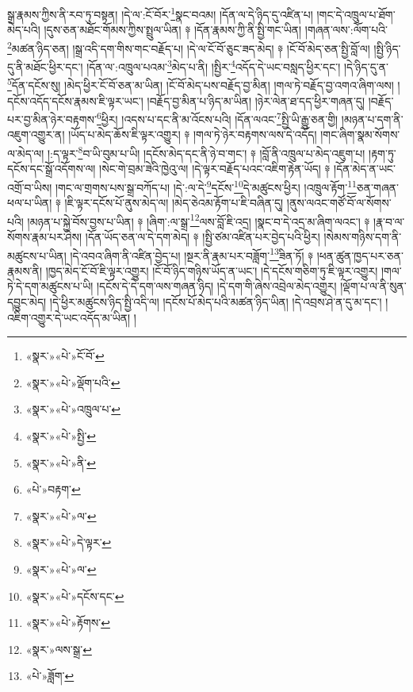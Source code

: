 སྒྲ་རྣམས་ཀྱིས་ནི་རབ་ཏུ་བསྟན། །དེ་ལ་:ངོ་བོར་\footnote{«སྣར་»«པེ་»ངོ་བོ་}སྣང་བའམ། །དོན་ལ་དེ་ཉིད་དུ་འཛིན་པ། །གང་དེ་འཁྲུལ་པ་ཐོག་མེད་པའི། །དུས་ཅན་མཐོང་གོམས་ཀྱིས་སྤྲུལ་ཡིན། ༈ །དོན་རྣམས་ཀྱི་ནི་སྤྱི་གང་ཡིན། །གཞན་ལས་:ལོག་པའི་\footnote{«སྣར་»«པེ་»ལྡོག་པའི་}མཚན་ཉིད་ཅན། །སྒྲ་འདི་དག་གིས་གང་བརྗོད་པ། །དེ་ལ་ངོ་བོ་ཅུང་ཟད་མེད། ༈ །ངོ་བོ་མེད་ཅན་སྤྱི་བློ་ལ། །སྤྱི་ཉིད་དུ་ནི་མཐོང་ཕྱིར་དང་། །དོན་ལ་:འཁྲུལ་པའམ་\footnote{«སྣར་»«པེ་»འཁྲུལ་པ་}མེད་པ་ནི། །སྤྱིར་\footnote{«སྣར་»«པེ་»སྤྱི་}འདོད་དེ་ཡང་བསླད་ཕྱིར་དང་། །དེ་ཉིད་དུ་ན་\footnote{«སྣར་»«པེ་»ནི་}དོན་དངོས་སུ། །མེད་ཕྱིར་ངོ་བོ་ཅན་མ་ཡིན། །ངོ་བོ་མེད་པས་བརྗོད་བྱ་མིན། །གལ་ཏེ་བརྗོད་བྱ་འགའ་ཞིག་ལས། །དངོས་འདོད་དངོས་རྣམས་ཇི་ལྟར་ཡང་། །བརྗོད་བྱ་མིན་པ་ཉིད་མ་ཡིན། །ཉེར་ལེན་ཐ་དད་ཕྱིར་གཞན་དུ། །བརྗོད་པར་བྱ་མིན་ཉེར་བརྟགས་\footnote{«པེ་»བརྟག་}ཕྱིར། །འདས་པ་དང་ནི་མ་འོངས་པའི། །དོན་ལའང་\footnote{«སྣར་»«པེ་»ལ་}སྤྱི་ཡི་རྒྱུ་ཅན་གྱི། །མཉན་པ་དག་ནི་འཇུག་འགྱུར་ན། །ཡོད་པ་མེད་ཆོས་ཇི་ལྟར་འགྱུར། ༈ །གལ་ཏེ་ཉེར་བརྟགས་ལས་དེ་འདོད། །གང་ཞིག་སྣམ་སོགས་ལ་མེད་ལ། །:ད་ལྟར་\footnote{«སྣར་»«པེ་»དེ་ལྟར་}བ་ཡི་བུམ་པ་ཡི། །དངོས་མེད་དང་ནི་ཉེ་བ་གང་། ༈ །བློ་ནི་འཁྲུལ་པ་མེད་འཇུག་པ། །རྟག་ཏུ་དངོས་དང་སྒྲོ་འདོགས་ལ། །སེང་གེ་བྲམ་ཟེའི་ཁྱེའུ་ལ། །དེ་ལྟར་བརྗོད་པའང་འཇིག་རྟེན་ཡོད། ༈ །དོན་མེད་ན་ཡང་འགྲོ་བ་ཡིས། །གང་ལ་གྲགས་པས་སྒྲ་བཀོད་པ། །དེ་:ལ་དེ་\footnote{«སྣར་»«པེ་»ལ་}དངོས་\footnote{«སྣར་»«པེ་»དངོས་དང་}དེ་མཚུངས་ཕྱིར། །འཁྲུལ་རྟོག་\footnote{«སྣར་»«པེ་»རྟོགས་}ཅན་གཞན་ཕལ་པ་ཡིན། ༈ །ཇི་ལྟར་དངོས་པོ་ནུས་མེད་ལ། །མེད་ཅེའམ་རྟོག་པ་ཇི་བཞིན་དུ། །ནུས་ལའང་གཙོ་བོ་ལ་སོགས་པའི། །མཉན་པ་སྐྱེ་བོས་བྱས་པ་ཡིན། ༈ །ཞིག་:ལ་སྒྲ་\footnote{«སྣར་»ལས་སྒྲ་}ལས་བློ་ཇི་འདྲ། །སྣང་བ་དེ་འདྲ་མ་ཞིག་ལའང་། ༈ །རྣ་བ་ལ་སོགས་རྣམ་པར་ཤེས། །དོན་ཡོད་ཅན་ལ་དེ་དག་མེད། ༈ །སྤྱི་ཙམ་འཛིན་པར་བྱེད་པའི་ཕྱིར། །སེམས་གཉིས་དག་ནི་མཚུངས་པ་ཡིན། །དེ་འབའ་ཞིག་ནི་འཛིན་བྱེད་པ། །སྔར་ནི་རྣམ་པར་བཟློག་\footnote{«པེ་»ཟློག་}ཟིན་ཏོ། ༈ །ཕན་ཚུན་ཁྱད་པར་ཅན་རྣམས་ནི། །ཁྱད་མེད་ངོ་བོ་ཇི་ལྟར་འགྱུར། །ངོ་བོ་ཉིད་གཉིས་ཡོད་ན་ཡང་། །དེ་དངོས་གཅིག་ཏུ་ཇི་ལྟར་འགྱུར། །གལ་ཏེ་དེ་དག་མཚུངས་པ་ཡི། །དངོས་དེ་དེ་དག་ལས་གཞན་ཉིད། །དེ་དག་གི་ཞེས་འབྲེལ་མེད་འགྱུར། །ལྡོག་པ་ལ་ནི་སུན་དབྱུང་མེད། །དེ་ཕྱིར་མཚུངས་ཉིད་སྤྱི་འདི་ལ། །དངོས་པོ་མེད་པའི་མཚན་ཉིད་ཡིན། །དེ་འབྲས་ཤེ་ན་དུ་མ་དང་། །འཇིག་འགྱུར་དེ་ཡང་འདོད་མ་ཡིན། །
